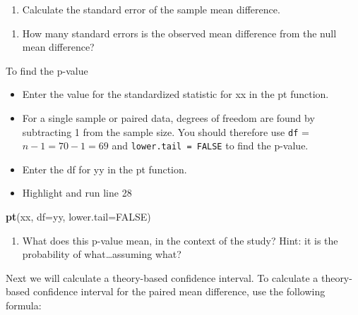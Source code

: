 \documentclass[
]{report}
\newenvironment{Shaded}{\begin{snugshade}}{\end{snugshade}}
\newcommand{\AttributeTok}[1]{\textcolor[rgb]{0.13,0.29,0.53}{#1}}
\newcommand{\ConstantTok}[1]{\textcolor[rgb]{0.56,0.35,0.01}{#1}}
\newcommand{\FunctionTok}[1]{\textcolor[rgb]{0.13,0.29,0.53}{\textbf{#1}}}
\newcommand{\NormalTok}[1]{#1}
\providecommand{\tightlist}{%
  \setlength{\itemsep}{0pt}\setlength{\parskip}{0pt}}
\begin{document}
\begin{enumerate}
\def\labelenumi{\arabic{enumi}.}
\setcounter{enumi}{6}
\tightlist
\item
  Calculate the standard error of the sample mean difference.
\end{enumerate}

\vspace{0.5in}

\begin{enumerate}
\def\labelenumi{\arabic{enumi}.}
\setcounter{enumi}{7}
\tightlist
\item
  How many standard errors is the observed mean difference from the null mean difference?
\end{enumerate}

\vspace{0.5in}

To find the p-value

\begin{itemize}
\item
  Enter the value for the standardized statistic for xx in the pt function.
\item
  For a single sample or paired data, degrees of freedom are found by subtracting 1 from the sample size. You should therefore use \texttt{df} = \(n-1 = 70 - 1 = 69\) and \texttt{lower.tail\ =\ FALSE} to find the p-value.
\item
  Enter the df for yy in the pt function.
\item
  Highlight and run line 28
\end{itemize}

\begin{Shaded}
\begin{Highlighting}[]
\FunctionTok{pt}\NormalTok{(xx, }\AttributeTok{df=}\NormalTok{yy, }\AttributeTok{lower.tail=}\ConstantTok{FALSE}\NormalTok{)}
\end{Highlighting}
\end{Shaded}

\begin{enumerate}
\def\labelenumi{\arabic{enumi}.}
\setcounter{enumi}{8}
\tightlist
\item
  What does this p-value mean, in the context of the study? Hint: it is the probability of what\ldots assuming what?
  \vspace{1in}
\end{enumerate}

Next we will calculate a theory-based confidence interval. To calculate a theory-based confidence interval for the paired mean difference, use the following formula:
\end{document}
